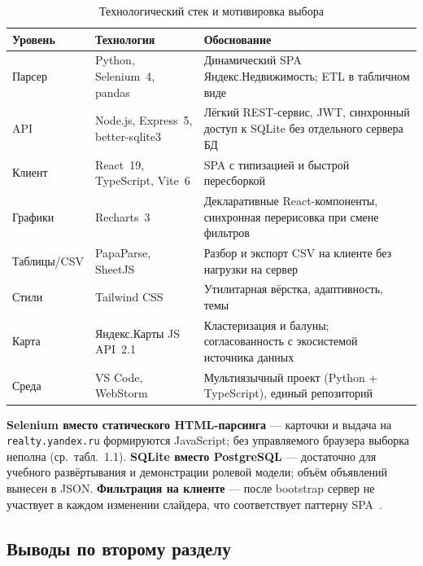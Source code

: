 \begin{table}[htbp]
\centering
\small
\setlength{\tabcolsep}{3pt}
\begin{tabular}{|p{}|p{}|p{}|}
\hline
\textbf{Уровень} & \textbf{Технология} & \textbf{Обоснование} \\
\hline
Парсер & Python, Selenium~4, pandas & Динамический SPA Яндекс.Недвижимость; ETL в табличном виде~\cite{selenium,mckinney2023,pandas-docs} \\
\hline
API & Node.js, Express~5, better-sqlite3 & Лёгкий REST-сервис, JWT, синхронный доступ к SQLite без отдельного сервера БД~\cite{express,sqlite} \\
\hline
Клиент & React~19, TypeScript, Vite~6 & SPA с типизацией и быстрой пересборкой~\cite{react,typescript,vite,sultanov2022} \\
\hline
Графики & Recharts~3 & Декларативные React-компоненты, синхронная перерисовка при смене фильтров~\cite{recharts} \\
\hline
Таблицы/CSV & PapaParse, SheetJS & Разбор и экспорт CSV на клиенте без нагрузки на сервер~\cite{papaparse,sheetjs} \\
\hline
Стили & Tailwind CSS & Утилитарная вёрстка, адаптивность, темы~\cite{tailwind} \\
\hline
Карта & Яндекс.Карты JS API~2.1 & Кластеризация и балуны; согласованность с экосистемой источника данных~\cite{yandex-maps-api} \\
\hline
Среда & VS Code, WebStorm & Мультиязычный проект (Python + TypeScript), единый репозиторий \\
\hline
\end{tabular}
\caption{Технологический стек и мотивировка выбора}
\label{tab:stack}
\end{table}

\textbf{Selenium вместо статического HTML-парсинга} --- карточки и выдача на \texttt{realty.yandex.ru} формируются JavaScript; без управляемого браузера выборка неполна (ср.~табл.~1.1). \textbf{SQLite вместо PostgreSQL} --- достаточно для учебного развёртывания и демонстрации ролевой модели; объём объявлений вынесен в JSON. \textbf{Фильтрация на клиенте} --- после bootstrap сервер не участвует в каждом изменении слайдера, что соответствует паттерну SPA~\cite{nesterov2024,filimonova2024}.

\subsection{Выводы по второму разделу}

